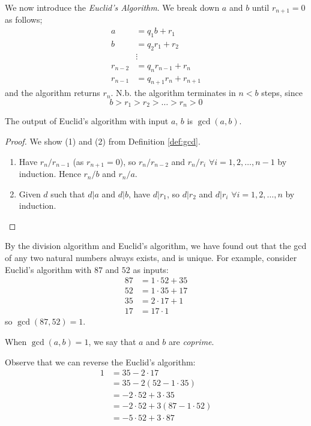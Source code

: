 \documentclass[10pt, a4paper, twoside]{report}
\begin{document}
We now introduce the \emph{Euclid's Algorithm}. We break down \(a\) and \(b\) until \(r_{n+1}=0\) as follows;
\begin{align*}
    a&=q_1b+r_1 \\
    b&=q_2r_1+r_2 \\
    &\vdots \\
    r_{n-2}&=q_nr_{n-1}+r_n \\
    r_{n-1}&=q_{n+1}r_n+r_{n+1}
\end{align*}
and the algorithm returns \(r_n\).
N.b. the algorithm terminates in \(n<b\) steps, since 
\[b>r_1>r_2>\ldots>r_n>0\]
\begin{theorem}
    The output of Euclid's algorithm with input \(a\), \(b\) is \(\gcd(a,b)\).
\end{theorem}
\begin{proof}
    We show (1) and (2) from Definition \ref{def:gcd}.
    \begin{enumerate}
        \item Have \(r_n/r_{n-1}\) (as \(r_{n+1}=0\)), so \(r_n/r_{n-2}\) and \(r_n/r_i\) \(\forall i=1,2,\ldots,n-1\) by induction. Hence \(r_n/b\) and \(r_n/a\).
        \item Given \(d\) such that \(d|a\) and \(d|b\), have \(d|r_1\), so \(d|r_2\) and \(d|r_i\) \(\forall i=1,2,\ldots,n\) by induction.
    \end{enumerate}
\end{proof}
By the division algorithm and Euclid's algorithm, we have found out that the gcd of any two natural numbers always exists, and is unique. For example, consider Euclid's algorithm with \(87\) and \(52\) as inputs:
\begin{align*}
    87&=1\cdot 52+35 \\
    52&=1\cdot 35+17 \\
    35&=2\cdot 17+1 \\
    17&=17\cdot1
\end{align*}
so \(\gcd(87,52)=1\).
\begin{definition}
    When \(\gcd(a,b)=1\), we say that \(a\) and \(b\) are \emph{coprime}.
\end{definition}
Observe that we can reverse the Euclid's algorithm:
\begin{align*}
    1&=35-2\cdot 17 \\
    &=35-2(52-1\cdot 35) \\
    &=-2\cdot 52 + 3\cdot 35 \\
    &=-2\cdot 52+3(87-1\cdot 52) \\
    &=-5\cdot 52+3\cdot 87
\end{align*}
\end{document}
